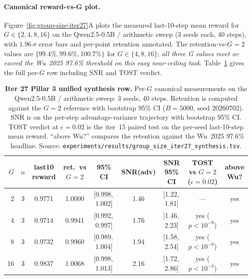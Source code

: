 \documentclass{article}
\begin{document}
\paragraph{Canonical reward-vs-G plot.}
Figure~\ref{fig:group-size-iter27}A plots the measured last-10-step
mean reward for $G\in\{2,4,8,16\}$ on the Qwen2.5-0.5B /
arithmetic sweep (3 seeds each, 40 steps), with $1.96\,\sigma$ error
bars and per-point retention annotated. The retention-vs-$G{=}2$ values
are $\{99.4\%, 99.6\%, 100.7\%\}$ for $G\in\{4,8,16\}$; \emph{all three
G values meet or exceed the Wu~2025 97.6\% threshold on this easy
near-ceiling task}. Table~\ref{tab:groupsize-iter27-synthesis}
gives the full per-$G$ row including SNR and TOST verdict.

\begin{table}[htbp]
\centering
\small
\begin{tabular}{rcccccccc}
\hline
$G$ & $n$ & last10 reward & ret.\ vs $G{=}2$ & 95\% CI & SNR(adv) & SNR 95\% CI & TOST vs $G{=}2$ ($\epsilon{=}0.02$) & above Wu? \\
\hline
2  & 3 & 0.9771 & 1.0000 & [0.998,\,1.002] & 1.46 & [1.22,\,1.81] & --- & yes \\
4  & 3 & 0.9714 & 0.9941 & [0.992,\,0.997] & 1.76 & [1.46,\,2.23] & yes ($p<10^{-9}$)  & yes \\
8  & 3 & 0.9732 & 0.9960 & [0.989,\,1.004] & 1.94 & [1.58,\,2.54] & yes ($p<10^{-9}$)  & yes \\
16 & 3 & 0.9837 & 1.0068 & [0.998,\,1.013] & 2.16 & [1.72,\,2.86] & yes ($p<10^{-4}$)  & yes \\
\hline
\end{tabular}
\caption{\textbf{Iter 27 Pillar 3 unified synthesis row.} Per-$G$
canonical measurements on the Qwen2.5-0.5B / arithmetic sweep: 3 seeds,
40 steps. Retention is computed against the $G{=}2$ reference with
bootstrap 95\% CI ($B{=}5000$, seed 20260702). SNR is on the per-step
advantage-variance trajectory with bootstrap 95\% CI. TOST verdict at
$\epsilon{=}0.02$ is the iter~15 paired test on the per-seed
last-10-step mean reward. ``above Wu?'' compares the retention against
the Wu~2025 $97.6\%$ headline. Source:
\texttt{experiments/results/group\_size\_iter27\_synthesis.tsv}.}
\label{tab:groupsize-iter27-synthesis}
\end{table}
\end{document}
